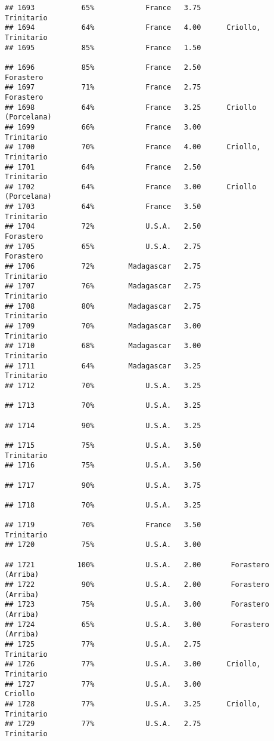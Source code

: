 \documentclass[
]{article}
\begin{document}
\begin{verbatim}
## 1693           65%            France   3.75               Trinitario
## 1694           64%            France   4.00      Criollo, Trinitario
## 1695           85%            France   1.50                         
## 1696           85%            France   2.50                Forastero
## 1697           71%            France   2.75                Forastero
## 1698           64%            France   3.25      Criollo (Porcelana)
## 1699           66%            France   3.00               Trinitario
## 1700           70%            France   4.00      Criollo, Trinitario
## 1701           64%            France   2.50               Trinitario
## 1702           64%            France   3.00      Criollo (Porcelana)
## 1703           64%            France   3.50               Trinitario
## 1704           72%            U.S.A.   2.50                Forastero
## 1705           65%            U.S.A.   2.75                Forastero
## 1706           72%        Madagascar   2.75               Trinitario
## 1707           76%        Madagascar   2.75               Trinitario
## 1708           80%        Madagascar   2.75               Trinitario
## 1709           70%        Madagascar   3.00               Trinitario
## 1710           68%        Madagascar   3.00               Trinitario
## 1711           64%        Madagascar   3.25               Trinitario
## 1712           70%            U.S.A.   3.25                         
## 1713           70%            U.S.A.   3.25                         
## 1714           90%            U.S.A.   3.25                         
## 1715           75%            U.S.A.   3.50               Trinitario
## 1716           75%            U.S.A.   3.50                         
## 1717           90%            U.S.A.   3.75                         
## 1718           70%            U.S.A.   3.25                         
## 1719           70%            France   3.50               Trinitario
## 1720           75%            U.S.A.   3.00                         
## 1721          100%            U.S.A.   2.00       Forastero (Arriba)
## 1722           90%            U.S.A.   2.00       Forastero (Arriba)
## 1723           75%            U.S.A.   3.00       Forastero (Arriba)
## 1724           65%            U.S.A.   3.00       Forastero (Arriba)
## 1725           77%            U.S.A.   2.75               Trinitario
## 1726           77%            U.S.A.   3.00      Criollo, Trinitario
## 1727           77%            U.S.A.   3.00                  Criollo
## 1728           77%            U.S.A.   3.25      Criollo, Trinitario
## 1729           77%            U.S.A.   2.75               Trinitario

\end{verbatim}
\end{document}
